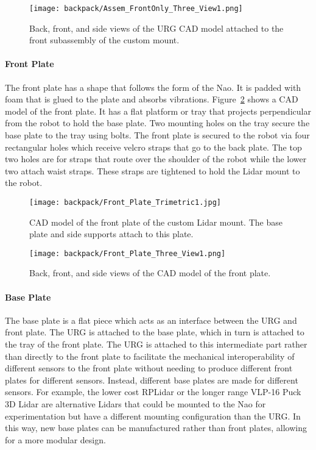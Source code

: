 \begin{figure}[H]
\centering
\texttt{[image: backpack/Assem\_FrontOnly\_Three\_View1.png]}
\caption{Back, front, and side views of the URG CAD model
         attached to the front subassembly of the custom mount.}
\label{fig:nao_lidar_mount_three_view1}
\end{figure}

\FloatBarrier

\paragraph{Front Plate}
The front plate has a shape that follows the form of the Nao.
It is padded with foam that is glued to the plate and absorbs vibrations.
Figure~\ref{fig:nao_lidar_mount_frontplate_trimetric1} shows a CAD model of the
front plate. It has a flat platform or tray that projects perpendicular from the 
robot to hold the base plate. 
Two mounting holes on the tray secure the base plate to the tray using bolts.
The front plate is secured to the robot via four rectangular holes which receive
velcro straps that go to the back plate. 
The top two holes are for straps that route over the shoulder of the robot while
the lower two attach waist straps.
These straps are tightened to hold the Lidar mount to the robot.

\begin{figure}
\centering
\texttt{[image: backpack/Front\_Plate\_Trimetric1.jpg]}
\caption{CAD model of the front plate of the custom Lidar
         mount. The base plate and side supports attach to this plate.}
\label{fig:nao_lidar_mount_frontplate_trimetric1}
\end{figure}

\begin{figure}
\centering
\texttt{[image: backpack/Front\_Plate\_Three\_View1.png]}
\caption{Back, front, and side views of the CAD model of the
         front plate.}
\label{fig:nao_lidar_mount_frontplate_three_view1}
\end{figure}


\paragraph{Base Plate}
The base plate is a flat piece which acts as an interface between
the URG and front plate.
The URG is attached to the base plate, which in turn is attached to the 
tray of the front plate. The URG is attached to this intermediate part
rather than directly to the front plate to facilitate the mechanical
interoperability of different sensors to the front plate without needing
to produce different front plates for different sensors. Instead, different
base plates are made for different sensors. For example, the lower cost
RPLidar \cite{rp_lidar} or the longer range VLP-16 Puck 3D Lidar
\cite{puck_lidar} are alternative Lidars that could
be mounted to the Nao for experimentation but have a different mounting 
configuration than the URG\@. In this way, new base plates can be manufactured
rather than front plates, allowing for a more modular design.

